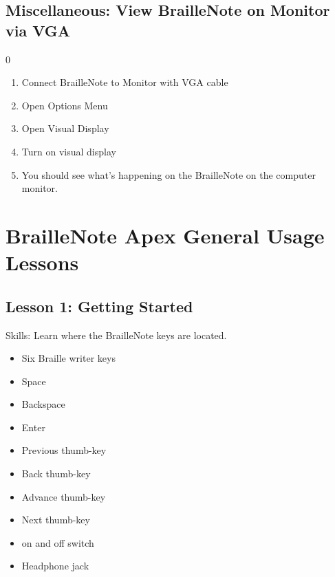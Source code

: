 \documentclass[10pt,letterpaper,twoside]{report}
\begin{document}
{{{{\clearpage
\section{Miscellaneous: View BrailleNote on Monitor via VGA}0
\begin{enumerate}
	\item Connect BrailleNote to Monitor with VGA cable
	\item Open Options Menu 
	\item Open Visual Display 
	\item Turn on visual display 
	\item You should see what's happening on the BrailleNote on the computer monitor.
\end{enumerate}


\chapter{BrailleNote Apex General Usage Lessons}
\section*{Lesson 1: Getting Started}

Skills:
Learn where the BrailleNote keys are located.
\begin{itemize}
	\item Six Braille writer keys
	\item Space
	\item Backspace
	\item Enter
	\item Previous thumb-key
	\item Back thumb-key
	\item Advance thumb-key
	\item Next thumb-key
	\item on and off switch
	\item Headphone jack
\end{itemize}

}}}}
\end{document}
